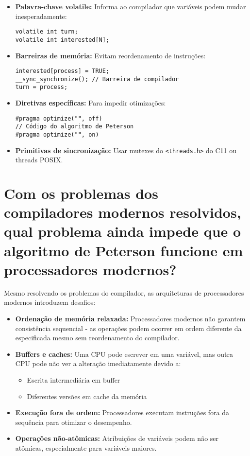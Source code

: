 \documentclass[10pt]{article}
\begin{document}
\begin{itemize}
    \item \textbf{Palavra-chave volatile:} Informa ao compilador que variáveis podem mudar inesperadamente:
    \begin{lstlisting}
volatile int turn;
volatile int interested[N];
    \end{lstlisting}

    \item \textbf{Barreiras de memória:} Evitam reordenamento de instruções:
    \begin{lstlisting}
interested[process] = TRUE;
__sync_synchronize(); // Barreira de compilador
turn = process;
    \end{lstlisting}

    \item \textbf{Diretivas específicas:} Para impedir otimizações:
    \begin{lstlisting}
#pragma optimize("", off)
// Código do algoritmo de Peterson
#pragma optimize("", on)
    \end{lstlisting}

    \item \textbf{Primitivas de sincronização:} Usar mutexes do \texttt{<threads.h>} do C11 ou threads POSIX.
\end{itemize}

\section{Com os problemas dos compiladores modernos resolvidos, qual problema ainda impede que o algoritmo de Peterson funcione em processadores modernos?}

Mesmo resolvendo os problemas do compilador, as arquiteturas de processadores modernos introduzem desafios:

\begin{itemize}
    \item \textbf{Ordenação de memória relaxada:} Processadores modernos não garantem consistência sequencial - as operações podem ocorrer em ordem diferente da especificada mesmo sem reordenamento do compilador.

    \item \textbf{Buffers e caches:} Uma CPU pode escrever em uma variável, mas outra CPU pode não ver a alteração imediatamente devido a:
    \begin{itemize}
        \item Escrita intermediária em buffer
        \item Diferentes versões em cache da memória
    \end{itemize}

    \item \textbf{Execução fora de ordem:} Processadores executam instruções fora da sequência para otimizar o desempenho.

    \item \textbf{Operações não-atômicas:} Atribuições de variáveis podem não ser atômicas, especialmente para variáveis maiores.
\end{itemize}
\end{document}
